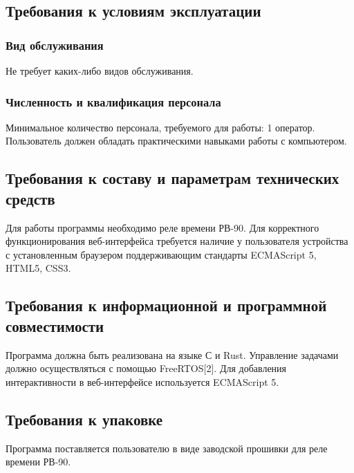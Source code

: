 \subsection{Требования к условиям эксплуатации}
\subsubsection{Вид обслуживания}
Не требует каких-либо видов обслуживания.

\subsubsection{Численность и квалификация персонала}
Минимальное количество персонала, требуемого для работы: 1 оператор. Пользователь должен обладать практическими навыками работы с компьютером.

\subsection{Требования к составу и параметрам технических средств}
Для работы программы необходимо реле времени РВ-90. Для корректного функционирования веб-интерфейса требуется наличие у пользователя устройства с установленным браузером поддерживающим стандарты ECMAScript 5, HTML5, CSS3.


\subsection{Требования к информационной и программной совместимости}

Программа должна быть реализована на языке С и Rust. Управление задачами должно осуществляться с помощью FreeRTOS[2]. Для добавления интерактивности в веб-интерфейсе используется ECMAScript 5.


\subsection{Требования к упаковке}
Программа поставляется пользователю в виде заводской прошивки для реле времени РВ-90. 
